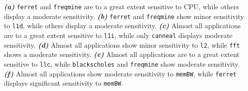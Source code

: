 

\emph{\textbf{(a)}} \texttt{ferret} and \texttt{freqmine} are to a great extent sensitive to CPU, while others display a moderate sensitivity.
\emph{\textbf{(b)}} \texttt{ferret} and \texttt{freqmine} show minor sensitivity to \texttt{l1d}, while others display a moderate sensitivity.
\emph{\textbf{(c)}} Almost all applications are to a great extent sensitive to \texttt{l1i}, while only \texttt{canneal} displays moderate sensitivity.
\emph{\textbf{(d)}} Almost all applications show minor sensitivity to \texttt{l2}, while \texttt{fft} shows a moderate sensitivity.
\emph{\textbf{(e)}} Almost all applications are to a great extent sensitive to \texttt{llc}, while \texttt{blackscholes} and \texttt{freqmine} show moderate sensitivity.
\emph{\textbf{(f)}} Almost all applications show moderate sensitivity to \texttt{memBW}, while \texttt{ferret} displays significant sensitivity to \texttt{memBW}.

